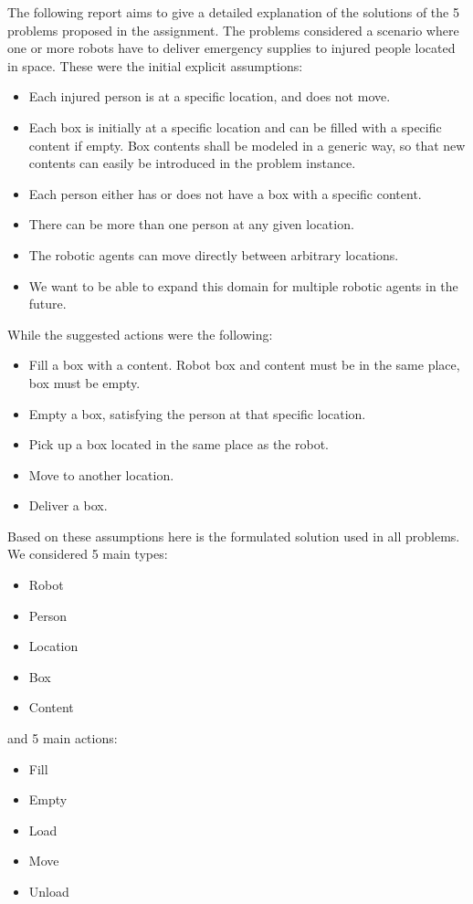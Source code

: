 The following report aims to give a detailed explanation of the solutions of the 5 problems proposed in the assignment.
The problems considered a scenario where one or more robots have to deliver emergency supplies to injured people located in space.
These were the initial explicit assumptions:
\begin{itemize}
    \item Each injured person is at a specific location, and does not move.
    \item Each box is initially at a specific location and can be filled with a specific content if empty. Box contents shall be modeled in a generic way, so that new contents can easily be introduced in the problem instance.
    \item Each person either has or does not have a box with a specific content.
    \item There can be more than one person at any given location.
    \item The robotic agents can move directly between arbitrary locations.
    \item We want to be able to expand this domain for multiple robotic agents in the future.
\end{itemize}  
While the suggested actions were the following:
\begin{itemize}
    \item Fill a box with a content. Robot box and content must be in the same place, box must be empty.
    \item Empty a box, satisfying the person at that specific location.
    \item Pick up a box located in the same place as the robot.
    \item Move to another location.
    \item Deliver a box.
\end{itemize}

Based on these assumptions here is the formulated solution used in all problems.
We considered 5 main types:
\begin{itemize}
    \item Robot
    \item Person
    \item Location
    \item Box
    \item Content
\end{itemize}
and 5 main actions:
\begin{itemize}
    \item Fill 
    \item Empty
    \item Load
    \item Move
    \item Unload
\end{itemize}


